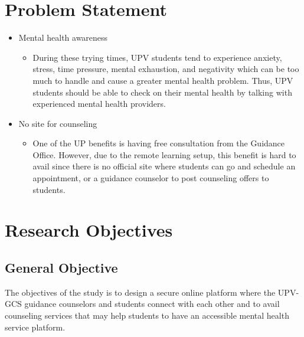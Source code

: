 \section{Problem Statement}
\begin{itemize}
\item Mental health awareness
	\begin{itemize}
	\item During these trying times, UPV students tend to experience anxiety, stress, time pressure, mental exhaustion, and negativity which can be too much to handle and cause a greater mental health problem. Thus, UPV students should be able to check on their mental health by talking with experienced mental health providers. 
	\end{itemize}
\item No site for counseling
	\begin{itemize}
	\item One of the UP benefits is having free consultation from the Guidance Office. However, due to the remote learning setup, this benefit is hard to avail since there is no official site where students can go and schedule an appointment, or a 	guidance counselor to post counseling offers to students.
	\end{itemize}
\end{itemize}


\section{Research Objectives}
\label{sec:researchobjectives}

\subsection{General Objective}
\label{sec:generalobjective}
The objectives of the study is to design a secure online platform where the UPV-GCS guidance counselors and students connect with each other and to avail counseling services that may help students to have an accessible mental health service platform. 
 
  
